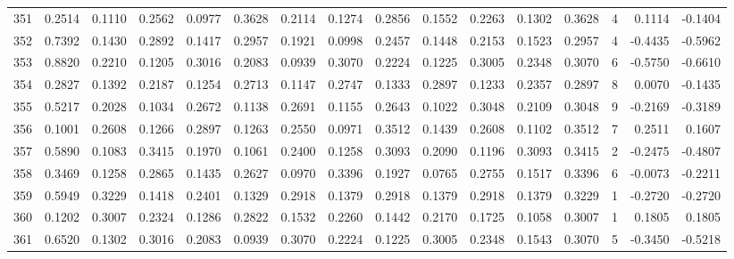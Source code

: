 \begin{tabular}{lrrrrrrrrrrrrrrr}
351 &      0.2514 &  0.1110 &  0.2562 &  0.0977 &  0.3628 &  0.2114 &  0.1274 &  0.2856 &  0.1552 &  0.2263 &   0.1302 &     0.3628 &      4 &                    0.1114 &                    -0.1404 \\
352 &      0.7392 &  0.1430 &  0.2892 &  0.1417 &  0.2957 &  0.1921 &  0.0998 &  0.2457 &  0.1448 &  0.2153 &   0.1523 &     0.2957 &      4 &                   -0.4435 &                    -0.5962 \\
353 &      0.8820 &  0.2210 &  0.1205 &  0.3016 &  0.2083 &  0.0939 &  0.3070 &  0.2224 &  0.1225 &  0.3005 &   0.2348 &     0.3070 &      6 &                   -0.5750 &                    -0.6610 \\
354 &      0.2827 &  0.1392 &  0.2187 &  0.1254 &  0.2713 &  0.1147 &  0.2747 &  0.1333 &  0.2897 &  0.1233 &   0.2357 &     0.2897 &      8 &                    0.0070 &                    -0.1435 \\
355 &      0.5217 &  0.2028 &  0.1034 &  0.2672 &  0.1138 &  0.2691 &  0.1155 &  0.2643 &  0.1022 &  0.3048 &   0.2109 &     0.3048 &      9 &                   -0.2169 &                    -0.3189 \\
356 &      0.1001 &  0.2608 &  0.1266 &  0.2897 &  0.1263 &  0.2550 &  0.0971 &  0.3512 &  0.1439 &  0.2608 &   0.1102 &     0.3512 &      7 &                    0.2511 &                     0.1607 \\
357 &      0.5890 &  0.1083 &  0.3415 &  0.1970 &  0.1061 &  0.2400 &  0.1258 &  0.3093 &  0.2090 &  0.1196 &   0.3093 &     0.3415 &      2 &                   -0.2475 &                    -0.4807 \\
358 &      0.3469 &  0.1258 &  0.2865 &  0.1435 &  0.2627 &  0.0970 &  0.3396 &  0.1927 &  0.0765 &  0.2755 &   0.1517 &     0.3396 &      6 &                   -0.0073 &                    -0.2211 \\
359 &      0.5949 &  0.3229 &  0.1418 &  0.2401 &  0.1329 &  0.2918 &  0.1379 &  0.2918 &  0.1379 &  0.2918 &   0.1379 &     0.3229 &      1 &                   -0.2720 &                    -0.2720 \\
360 &      0.1202 &  0.3007 &  0.2324 &  0.1286 &  0.2822 &  0.1532 &  0.2260 &  0.1442 &  0.2170 &  0.1725 &   0.1058 &     0.3007 &      1 &                    0.1805 &                     0.1805 \\
361 &      0.6520 &  0.1302 &  0.3016 &  0.2083 &  0.0939 &  0.3070 &  0.2224 &  0.1225 &  0.3005 &  0.2348 &   0.1543 &     0.3070 &      5 &                   -0.3450 &                    -0.5218 \\

\end{tabular}
